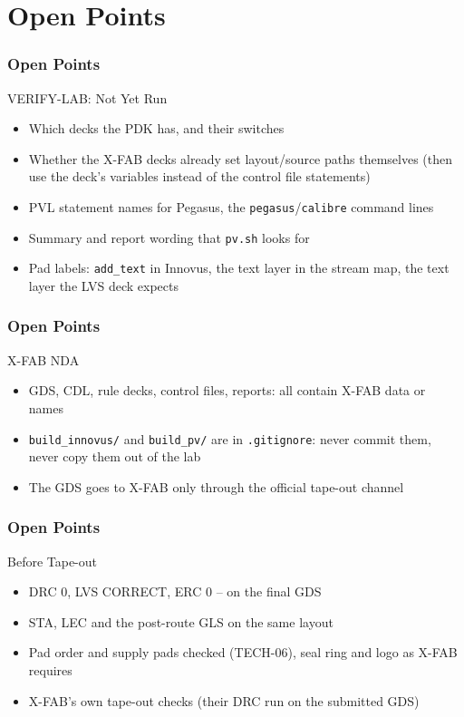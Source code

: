 \documentclass{beamer}
\newcommand{\astitle}{nix}
\newcommand{\assubtitle}{nix}
\newcommand{\cmd}[1]{\texttt{#1}}
\begin{document}
\section{Open Points}
\renewcommand{\astitle}{Open Points}

\renewcommand{\assubtitle}{VERIFY-LAB: Not Yet Run}
\begin{frame}
\frametitle{\astitle}
\begin{block}{\assubtitle}
  \begin{itemize}
    \item Which decks the PDK has, and their switches
    \item Whether the X-FAB decks already set layout/source paths
      themselves (then use the deck's variables instead of the control
      file statements)
    \item PVL statement names for Pegasus, the \cmd{pegasus}/\cmd{calibre}
      command lines
    \item Summary and report wording that \cmd{pv.sh} looks for
    \item Pad labels: \cmd{add\_text} in Innovus, the text layer in the
      stream map, the text layer the LVS deck expects
  \end{itemize}
\end{block}
\end{frame}

\renewcommand{\assubtitle}{X-FAB NDA}
\begin{frame}
\frametitle{\astitle}
\begin{block}{\assubtitle}
  \begin{itemize}
    \item GDS, CDL, rule decks, control files, reports: all contain X-FAB
      data or names
    \item \cmd{build\_innovus/} and \cmd{build\_pv/} are in
      \cmd{.gitignore}: never commit them, never copy them out of the lab
    \item The GDS goes to X-FAB only through the official tape-out
      channel
  \end{itemize}
\end{block}
\end{frame}

\renewcommand{\assubtitle}{Before Tape-out}
\begin{frame}
\frametitle{\astitle}
\begin{block}{\assubtitle}
  \begin{itemize}
    \item DRC 0, LVS CORRECT, ERC 0 -- on the final GDS
    \item STA, LEC and the post-route GLS on the same layout
    \item Pad order and supply pads checked (TECH-06), seal ring and
      logo as X-FAB requires
    \item X-FAB's own tape-out checks (their DRC run on the submitted GDS)
  \end{itemize}
\end{block}
\end{frame}
\end{document}
